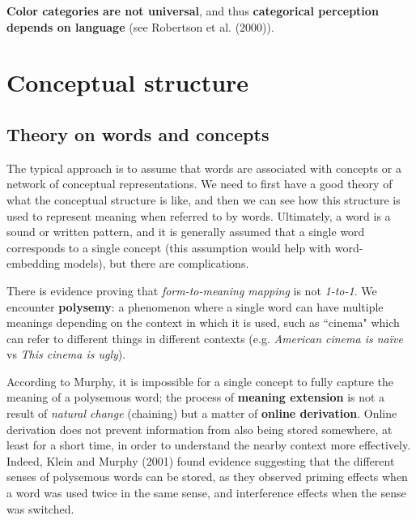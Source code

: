 \textbf{Color categories are not universal}, and thus \textbf{categorical perception depends on language} (see \notedv Robertson et al. (2000)).


\section{Conceptual structure}
\label{sec:conceptual_structure}

\subsection{Theory on words and concepts}
The typical approach is to assume that words are associated with concepts or a network of conceptual representations.
We need to first have a good theory of what the conceptual structure is like, and then we can see how this structure is used to represent meaning when referred to by words.
Ultimately, a word is a sound or written pattern, and it is generally assumed that a single word corresponds to a single concept (this assumption would help with word-embedding models), but there are complications.

There is evidence proving that \textit{form-to-meaning mapping} is not \textit{1-to-1}. We encounter \textbf{polysemy}: a phenomenon where a single word can have multiple meanings depending on the context in which it is used, such as ``cinema" which can refer to different things in different contexts (e.g. \textit{American cinema is naïve} vs \textit{This cinema is ugly}).

According to Murphy, it is impossible for a single concept to fully capture the meaning of a polysemous word; the process of \textbf{meaning extension} is not a result of \textit{natural change} (chaining) but a matter of \textbf{online derivation}. Online derivation does not prevent information from also being stored somewhere, at least for a short time, in order to understand the nearby context more effectively. Indeed, Klein and Murphy (2001) found evidence suggesting that the different senses of polysemous words can be stored, as they observed priming effects when a word was used twice in the same sense, and interference effects when the sense was switched.

